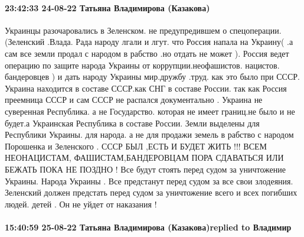 \paragraph{23:42:33 24-08-22 Татьяна Владимирова (Казакова)}

Украинцы разочаровались в Зеленском. не предупредившем о спецоперации.
(Зеленский .Влада. Рада народу лгали и лгут. что Россия напала на Украину( .а
сам все земли продал с народом в рабство .но отдать не может ). Россия ведет
операцию по защите народа Украины от коррупции.неофашистов. нацистов.
бандеровцев ) и дать народу Украины мир.дружбу .труд. как это было при СССР.
Украина находится в составе СССР.как СНГ в составе России. так как Россия
преемница СССР и сам СССР не распался документально . Украина не суверенная
Республика. а не Государство. которая не имеет границ.не было и не будет.а
Украинская Республика в составе России. Земли выделены для Республики Украины.
для народа. а не для продажи земель в рабство с народом Порошенка и Зеленского
. СССР БЫЛ ,ЕСТЬ И БУДЕТ ЖИТЬ !!! ВСЕМ НЕОНАЦИСТАМ, ФАШИСТАМ,БАНДЕРОВЦАМ ПОРА
СДАВАТЬСЯ ИЛИ БЕЖАТЬ ПОКА НЕ ПОЗДНО ! Все будут стоять перед судом за
уничтожение Украины. Народа Украины . Все предстанут перед судом за все свои
злодеяния. Зеленский должен предстать перед судом за уничтожение всего и всех
погибших людей. детей . Он не уйдет от наказания !

\paragraph{15:40:59 25-08-22 Татьяна Владимирова (Казакова)replied to Владимир}

